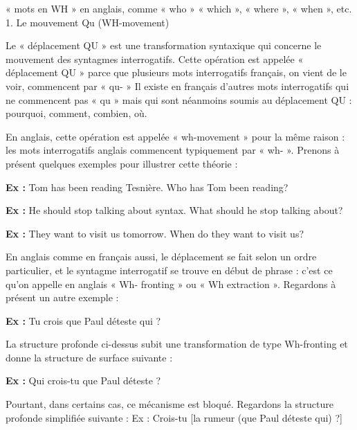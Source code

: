 « mots en WH » en anglais, comme « who » « which », « where », « when », etc. 1. Le mouvement Qu (WH-movement)\par

Le « déplacement QU » est une transformation syntaxique qui concerne le mouvement des syntagmes interrogatifs. Cette opération est appelée « déplacement QU » parce que plusieurs mots interrogatifs français, on vient de le voir, commencent par « qu- » Il existe en français d’autres mots interrogatifs qui ne commencent pas « qu » mais qui sont néanmoins soumis au déplacement QU : pourquoi, comment, combien, où.\par

En anglais, cette opération est appelée « wh-movement » pour la même raison : les mots interrogatifs anglais commencent typiquement par « wh- ». Prenons à présent quelques exemples pour illustrer cette théorie :\par

\noindent\textbf{Ex :} Tom has been reading Tesnière. Who has Tom been reading?\par

\noindent\textbf{Ex :} He should stop talking about syntax. What should he stop talking about?\par

\noindent\textbf{Ex :} They want to visit us tomorrow. When do they want to visit us?\par

En anglais comme en français aussi, le déplacement se fait selon un ordre particulier, et le syntagme interrogatif se trouve en début de phrase : c’est ce qu’on appelle en anglais « Wh- fronting » ou « Wh extraction ». Regardons à présent un autre exemple :\par


\noindent\textbf{Ex :} Tu crois que Paul déteste qui ?\par

La structure profonde ci-dessus subit une transformation de type Wh-fronting et donne la structure de surface suivante :\par

\noindent\textbf{Ex :} Qui crois-tu que Paul déteste ?\par

Pourtant, dans certains cas, ce mécanisme est bloqué. Regardons la structure profonde simplifiée suivante : Ex : Crois-tu [la rumeur (que Paul déteste qui) ?]\par

